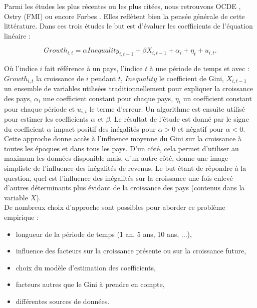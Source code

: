 \documentclass[11pt,a4paper]{article}
\begin{document}


Parmi les études les plus récentes ou les plus citées, nous retrouvons OCDE \cite{OECD}, Ostry (FMI) \cite{ostry} ou encore Forbes \cite{forbes}. Elles reflètent bien la pensée générale de cette littérature. Dans ces trois études le but est d'évaluer les coefficients de l'équation linéaire :

\begin{dmath}
Growth_{i,t} = \alpha Inequality_{i,t - 1} + \beta X_{i,t - 1} + \alpha_i + \eta_t + u_{i,t}.
\end{dmath}

Où l'indice $i$ fait référence à un pays, l'indice $t$ à une période de temps et avec : $Growth_{i,t}$ la croissance de $i$ pendant $t$, $Inequality$ le coefficient de Gini, $X_{i, t - 1}$ un ensemble de variables utilisées traditionnellement pour expliquer la croissance des pays, $\alpha_i$ une coefficient constant pour chaque pays, $\eta_t$ un coefficient constant pour chaque période et $u_{i, t}$ le terme d'erreur. Un algorithme est ensuite utilisé pour estimer les coefficients $\alpha$ et $\beta$. Le résultat de l'étude est donné par le signe du coefficient $\alpha$ impact positif des inégalités pour $\alpha > 0$ et négatif pour $\alpha < 0$. \\

Cette approche donne accès à l'influence moyenne du Gini sur la croissance à toutes les époques et dans tous les pays. D'un côté, cela permet d'utiliser au maximum les données disponible mais, d'un autre côté, donne une image simpliste de l'influence des inégalités de revenus. Le but étant de répondre à la question, quel est l'influence des inégalités sur la croissance une fois enlevé d'autres déterminants plus évidant de la croissance des pays (contenus dans la variable $X$). \\

De nombreux choix d'approche sont possibles pour aborder ce problème empirique : 

\begin{itemize}
\item longueur de la période de temps (1 an, 5 ans, 10 ans, ...), 
\item influence des facteurs sur la croissance présente ou sur la croissance future, 
\item choix du modèle d'estimation des coefficients, 
\item facteurs autres que le Gini à prendre en compte, 
\item différentes sources de données. 
\end{itemize}
\end{document}
